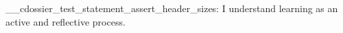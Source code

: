 \documentclass[type=teaching-philosophy]{careerdossier-statement}
\begin{document}
\MakeCDossierStatementHeader
\ExplSyntaxOn
\__cdossier_test_statement_assert_header_sizes:
\ExplSyntaxOff
I understand learning as an active and reflective process.
\end{document}
